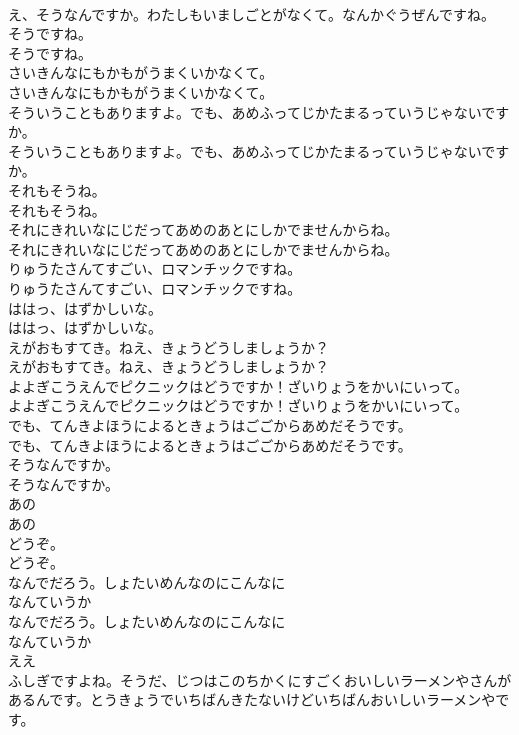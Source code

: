 \documentclass[8pt]{extreport}
\begin{document}
\begin{CJK}{UTF8}{min}
\\	え、そうなんですか。わたしもいましごとがなくて。なんかぐうぜんですね。
\\	そうですね。
\\	そうですね。
\\	さいきんなにもかもがうまくいかなくて。
\\	さいきんなにもかもがうまくいかなくて。
\\	そういうこともありますよ。でも、あめふってじかたまるっていうじゃないですか。
\\	そういうこともありますよ。でも、あめふってじかたまるっていうじゃないですか。
\\	それもそうね。
\\	それもそうね。
\\	それにきれいなにじだってあめのあとにしかでませんからね。
\\	それにきれいなにじだってあめのあとにしかでませんからね。
\\	りゅうたさんてすごい、ロマンチックですね。
\\	りゅうたさんてすごい、ロマンチックですね。
\\	ははっ、はずかしいな。
\\	ははっ、はずかしいな。
\\	えがおもすてき。ねえ、きょうどうしましょうか？
\\	えがおもすてき。ねえ、きょうどうしましょうか？
\\	よよぎこうえんでピクニックはどうですか！ざいりょうをかいにいって。
\\	よよぎこうえんでピクニックはどうですか！ざいりょうをかいにいって。
\\	でも、てんきよほうによるときょうはごごからあめだそうです。
\\	でも、てんきよほうによるときょうはごごからあめだそうです。
\\	そうなんですか。
\\	そうなんですか。
\\	あの
\\	あの
\\	どうぞ。
\\	どうぞ。
\\	なんでだろう。しょたいめんなのにこんなに
\\	なんていうか
\\	なんでだろう。しょたいめんなのにこんなに
\\	なんていうか
\\	ええ
\\	ふしぎですよね。そうだ、じつはこのちかくにすごくおいしいラーメンやさんがあるんです。とうきょうでいちばんきたないけどいちばんおいしいラーメンやです。

\end{CJK}
\end{document}
